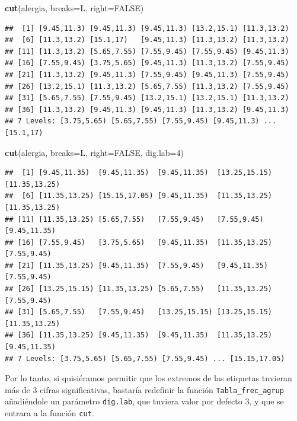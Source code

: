 \documentclass[]{book}
\newenvironment{Shaded}{\begin{snugshade}}{\end{snugshade}}
\newcommand{\DataTypeTok}[1]{\textcolor[rgb]{0.13,0.29,0.53}{#1}}
\newcommand{\DecValTok}[1]{\textcolor[rgb]{0.00,0.00,0.81}{#1}}
\newcommand{\KeywordTok}[1]{\textcolor[rgb]{0.13,0.29,0.53}{\textbf{#1}}}
\newcommand{\NormalTok}[1]{#1}
\newcommand{\OtherTok}[1]{\textcolor[rgb]{0.56,0.35,0.01}{#1}}
\theoremstyle{definition}
\theoremstyle{definition}
\theoremstyle{definition}
\theoremstyle{remark}
\begin{document}
\begin{Shaded}
\begin{Highlighting}[]
\KeywordTok{cut}\NormalTok{(alergia, }\DataTypeTok{breaks=}\NormalTok{L, }\DataTypeTok{right=}\OtherTok{FALSE}\NormalTok{)}
\end{Highlighting}
\end{Shaded}

\begin{verbatim}
##  [1] [9.45,11.3) [9.45,11.3) [9.45,11.3) [13.2,15.1) [11.3,13.2)
##  [6] [11.3,13.2) [15.1,17)   [9.45,11.3) [11.3,13.2) [11.3,13.2)
## [11] [11.3,13.2) [5.65,7.55) [7.55,9.45) [7.55,9.45) [9.45,11.3)
## [16] [7.55,9.45) [3.75,5.65) [9.45,11.3) [11.3,13.2) [7.55,9.45)
## [21] [11.3,13.2) [9.45,11.3) [7.55,9.45) [9.45,11.3) [7.55,9.45)
## [26] [13.2,15.1) [11.3,13.2) [5.65,7.55) [11.3,13.2) [7.55,9.45)
## [31] [5.65,7.55) [7.55,9.45) [13.2,15.1) [13.2,15.1) [11.3,13.2)
## [36] [11.3,13.2) [9.45,11.3) [9.45,11.3) [11.3,13.2) [9.45,11.3)
## 7 Levels: [3.75,5.65) [5.65,7.55) [7.55,9.45) [9.45,11.3) ... [15.1,17)
\end{verbatim}

\begin{Shaded}
\begin{Highlighting}[]
\KeywordTok{cut}\NormalTok{(alergia, }\DataTypeTok{breaks=}\NormalTok{L, }\DataTypeTok{right=}\OtherTok{FALSE}\NormalTok{, }\DataTypeTok{dig.lab=}\DecValTok{4}\NormalTok{)}
\end{Highlighting}
\end{Shaded}

\begin{verbatim}
##  [1] [9.45,11.35)  [9.45,11.35)  [9.45,11.35)  [13.25,15.15) [11.35,13.25)
##  [6] [11.35,13.25) [15.15,17.05) [9.45,11.35)  [11.35,13.25) [11.35,13.25)
## [11] [11.35,13.25) [5.65,7.55)   [7.55,9.45)   [7.55,9.45)   [9.45,11.35) 
## [16] [7.55,9.45)   [3.75,5.65)   [9.45,11.35)  [11.35,13.25) [7.55,9.45)  
## [21] [11.35,13.25) [9.45,11.35)  [7.55,9.45)   [9.45,11.35)  [7.55,9.45)  
## [26] [13.25,15.15) [11.35,13.25) [5.65,7.55)   [11.35,13.25) [7.55,9.45)  
## [31] [5.65,7.55)   [7.55,9.45)   [13.25,15.15) [13.25,15.15) [11.35,13.25)
## [36] [11.35,13.25) [9.45,11.35)  [9.45,11.35)  [11.35,13.25) [9.45,11.35) 
## 7 Levels: [3.75,5.65) [5.65,7.55) [7.55,9.45) ... [15.15,17.05)
\end{verbatim}

Por lo tanto, si quisiéramos permitir que los extremos de las etiquetas tuvieran más de 3 cifras significativas, bastaría redefinir la función \texttt{Tabla\_frec\_agrup} añadiéndole un parámetro \texttt{dig.lab}, que tuviera valor por defecto 3, y que se entrara a la función \texttt{cut}.
\end{document}
